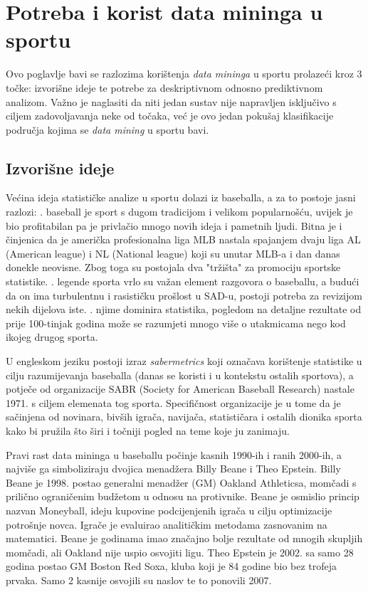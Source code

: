 \documentclass{ferseminar}
\begin{document}
\section{Potreba i korist data mininga u sportu}

Ovo poglavlje bavi se razlozima korištenja \textit{data mininga} u sportu prolazeći kroz 3 točke: izvorišne ideje te potrebe za deskriptivnom odnosno prediktivnom analizom. Važno je naglasiti da niti jedan sustav nije napravljen isključivo s ciljem zadovoljavanja neke od točaka, već je ovo jedan pokušaj klasifikacije područja kojima se \textit{data mining} u sportu bavi.

\subsection{Izvorišne ideje}
Većina ideja statističke analize u sportu dolazi iz baseballa, a za to postoje jasni razlozi:
. baseball je sport s dugom tradicijom i velikom popularnošću, uvijek je bio profitabilan pa je privlačio mnogo novih ideja i pametnih ljudi. Bitna je i činjenica da je američka profesionalna liga MLB nastala spajanjem dvaju liga AL (American league) i NL (National league) koji su unutar MLB-a i dan danas donekle neovisne. Zbog toga su postojala dva "tržišta" za promociju sportske statistike.
. legende sporta vrlo su važan element razgovora o baseballu, a budući da on ima turbulentnu i rasističku prošlost u SAD-u, postoji potreba za revizijom nekih dijelova iste.
. njime dominira statistika, pogledom na detaljne rezultate od prije 100-tinjak godina može se razumjeti mnogo više o utakmicama nego kod ikojeg drugog sporta.
\newline

U engleskom jeziku postoji izraz \textit{sabermetrics} koji označava korištenje statistike u cilju razumijevanja baseballa (danas se koristi i u kontekstu ostalih sportova), a potječe od organizacije SABR (Society for American Baseball Research) nastale 1971. s ciljem elemenata tog sporta. Specifičnost organizacije je u tome da je sačinjena od novinara, bivših igrača, navijača, statističara i ostalih dionika sporta kako bi pružila što širi i točniji pogled na teme koje ju zanimaju.

Pravi rast data mininga u baseballu počinje kasnih 1990-ih i ranih 2000-ih, a najviše ga simboliziraju dvojica menadžera Billy Beane i Theo Epstein. Billy Beane je 1998. postao generalni menadžer (GM) Oakland Athleticsa, momčadi s prilično ograničenim budžetom u odnosu na protivnike. Beane je osmislio princip nazvan Moneyball, ideju kupovine podcijenjenih igrača u cilju optimizacije potrošnje novca. Igrače je evaluirao analitičkim metodama zasnovanim na matematici. Beane je godinama imao značajno bolje rezultate od mnogih skupljih momčadi, ali Oakland nije uspio osvojiti ligu. Theo Epstein je 2002. sa samo 28 godina postao GM Boston Red Soxa, kluba koji je 84
\newpage
\noindent godine bio bez trofeja prvaka. Samo 2 kasnije osvojili su naslov te to ponovili 2007.
\end{document}
